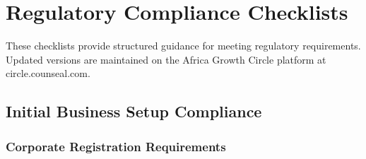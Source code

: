 
\chapter{Regulatory Compliance Checklists}\label{ch:regulatory-compliance}

\begin{importantbox}
    These checklists provide structured guidance for meeting regulatory requirements. Updated versions are maintained on the Africa Growth Circle platform at circle.counseal.com.
\end{importantbox}

\vspace{2em}


\section{Initial Business Setup Compliance}\label{sec:initial-compliance}
\vspace{1em}

\subsection{Corporate Registration Requirements}\label{subsec:corporate-registration}
\vspace{1em}

